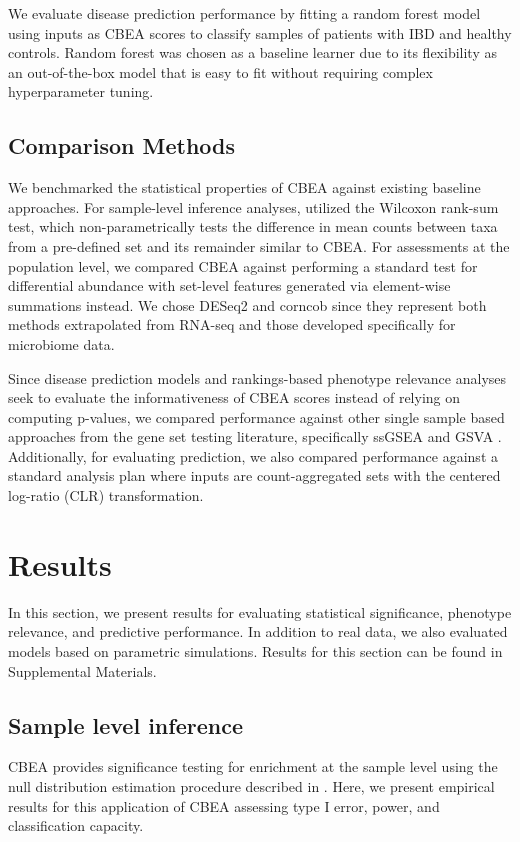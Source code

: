 \documentclass[10pt,letterpaper]{article}
\begin{document}
We evaluate disease prediction performance by fitting a random forest model \cite{breiman2001} using inputs as CBEA scores to classify samples of patients with IBD and healthy controls. Random forest was chosen as a baseline learner due to its flexibility as an out-of-the-box model that is easy to fit without requiring complex hyperparameter tuning. 

\subsection*{Comparison Methods} 
We benchmarked the statistical properties of CBEA against existing baseline approaches. For sample-level inference analyses, utilized the Wilcoxon rank-sum test, which non-parametrically tests the difference in mean counts between taxa from a pre-defined set and its remainder similar to CBEA. For assessments at the population level, we compared CBEA against performing a standard test for differential abundance with set-level features generated via element-wise summations instead. We chose DESeq2 \cite{love2014} and corncob \cite{martin2020} since they represent both methods extrapolated from RNA-seq \cite{mcmurdie2014} and those developed specifically for microbiome data.   

Since disease prediction models and rankings-based phenotype relevance analyses seek to evaluate the informativeness of CBEA scores instead of relying on computing p-values, we compared performance against other single sample based approaches from the gene set testing literature, specifically ssGSEA \cite{barbie2009} and GSVA \cite{hanzelmann2013}. Additionally, for evaluating prediction, we also compared performance against a standard analysis plan where inputs are count-aggregated sets with the centered log-ratio (CLR) transformation. 

\section*{Results}
In this section, we present results for evaluating statistical significance, phenotype relevance, and predictive performance. In addition to real data, we also evaluated models based on parametric simulations. Results for this section can be found in Supplemental Materials.   

\subsection*{Sample level inference}
CBEA provides significance testing for enrichment at the sample level using the null distribution estimation procedure described in . Here, we present empirical results for this application of CBEA assessing type I error, power, and classification capacity. 
\end{document}
